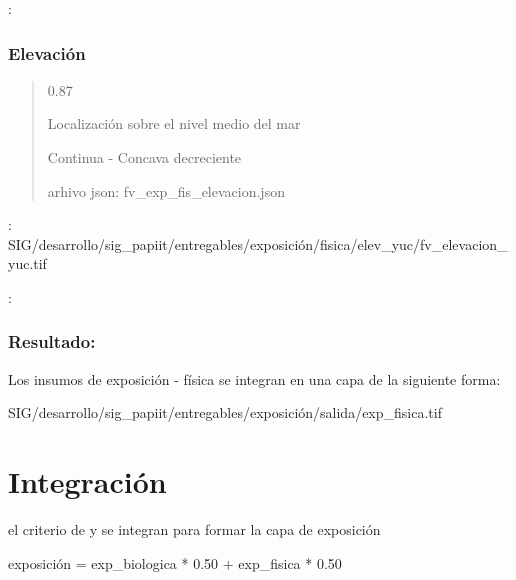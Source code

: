 \documentclass[letterpaper,10pt,spanish]{sphinxmanual}
\begin{document}

: 


\subsubsection{Elevación}
\label{\detokenize{exposicion:elevacion}}
\begin{quote}

 0.87


 Localización sobre el nivel medio del mar

 Continua - Concava decreciente

arhivo json: fv\_exp\_fis\_elevacion.json


\noindent{}
\end{quote}

: SIG/desarrollo/sig\_papiit/entregables/exposición/fisica/elev\_yuc/fv\_elevacion\_yuc.tif


: 


\subsubsection{Resultado:}
\label{\detokenize{exposicion:id1}}
Los insumos de exposición - física se integran en una capa de la siguiente forma:


 SIG/desarrollo/sig\_papiit/entregables/exposición/salida/exp\_fisica.tif


\section{Integración}
\label{\detokenize{exposicion:integracion}}
el criterio de  y  se integran  para formar la capa de exposición

exposición = exp\_biologica * 0.50 + exp\_fisica * 0.50
\end{document}
